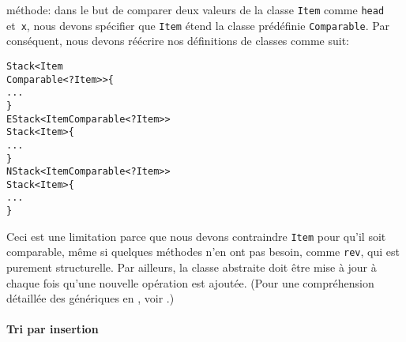 méthode: dans le but de comparer deux valeurs de la classe
\texttt{Item} comme \texttt{head} et~\texttt{x}, nous devons spécifier
que \texttt{Item} étend la classe prédéfinie \texttt{Comparable}. Par
conséquent, nous devons réécrire nos définitions de classes comme
suit:
\begin{alltt}
\public \abstractX \class Stack<Item
\hfill\extends Comparable<? \super Item>> \{
  ...
\}
\public \class EStack<Item \extends Comparable<? \super Item>> 
       \extends Stack<Item> \{
  ...
\}
\public \class NStack<Item \extends Comparable<? \super Item>>
       \extends Stack<Item> \{
  ...
\}
\end{alltt}
Ceci est une limitation parce que nous devons contraindre
\texttt{Item} pour qu'il soit comparable, même si quelques méthodes
n'en ont pas besoin, comme \texttt{rev}, qui est purement
structurelle. Par ailleurs, la classe abstraite doit être mise à jour
à chaque fois qu'une nouvelle opération est ajoutée. (Pour une
compréhension détaillée des génériques en \Java, voir
\cite{NaftalinWadler_2006}.)  

\paragraph{Tri par insertion}

